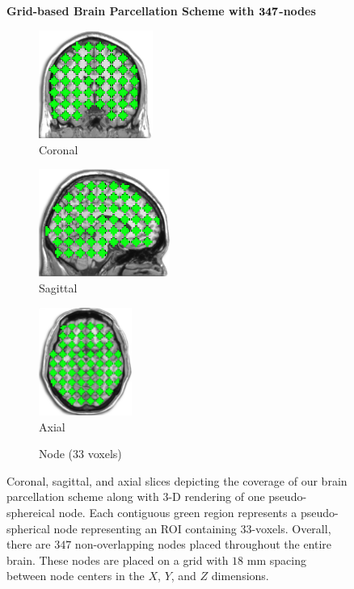 \renewcommand{\imwidth}  {0.2425\linewidth}
\renewcommand{\imwidthh}  {0.19\linewidth}
\begin{figure}[t!]
	\centering
	\textbf{\large{Grid-based Brain Parcellation Scheme with $\bm{347}$-nodes}} \vspace{8pt}\\
	\begin{subfigure}[t]{\imwidth}
		\centering
		\includegraphics[height=100pt]{roi_slice_cor.png}
		\caption{Coronal}
	\end{subfigure}\hspace{12pt}
	\begin{subfigure}[t]{\imwidth}
		\centering
		\includegraphics[height=100pt]{roi_slice_sag.png}
		\caption{Sagittal}
	\end{subfigure}\hspace{12pt}
	\begin{subfigure}[t]{\imwidth}
		\centering
		\includegraphics[height=100pt]{roi_slice_axi.png}
		\caption{Axial}
	\end{subfigure}
	\begin{subfigure}[t]{\imwidthh}
		\centering
		\caption{Node (33 voxels)}
	\end{subfigure}
	\caption{
	Coronal, sagittal, and axial slices depicting the coverage of our brain parcellation scheme along with $3$-D rendering of one pseudo-sphereical node. 
	Each contiguous green region represents a pseudo-spherical node representing an ROI containing $33$-voxels.
	Overall, there are $347$ non-overlapping nodes placed throughout the entire brain.
	These nodes are placed on a grid with $18$ mm spacing between node centers in the $X$, $Y$, and $Z$ dimensions.
	}
	\label{fig:roi,grid,slice}
\end{figure}
